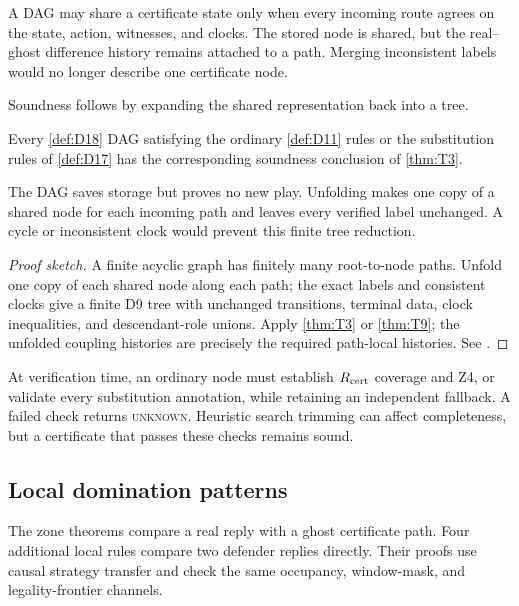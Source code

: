\begin{plainterms}
A DAG may share a certificate state only when every incoming route agrees on
the state, action, witnesses, and clocks.  The stored node is shared, but the
real--ghost difference history remains attached to a path.  Merging
inconsistent labels would no longer describe one certificate node.
\end{plainterms}

Soundness follows by expanding the shared representation back into a tree.

\begin{theorem}
\label{thm:T10}
\upshape
Every \cref{def:D18} DAG satisfying the ordinary \cref{def:D11} rules or the
substitution rules of \cref{def:D17} has the corresponding soundness
conclusion of \cref{thm:T3}.
\end{theorem}

\begin{plainterms}
The DAG saves storage but proves no new play.  Unfolding makes one copy of a
shared node for each incoming path and leaves every verified label unchanged.
A cycle or inconsistent clock would prevent this finite tree reduction.
\end{plainterms}

\begin{proof}[Proof sketch]
A finite acyclic graph has finitely many root-to-node paths.  Unfold one copy
of each shared node along each path; the exact labels and consistent clocks
give a finite D9 tree with unchanged transitions, terminal data, clock
inequalities, and descendant-role unions.  Apply \cref{thm:T3} or
\cref{thm:T9}; the unfolded coupling histories are precisely the required
path-local histories.  See \cite{hexobot-companions}.
\end{proof}

At verification time, an ordinary node must establish $R_{\mathrm{cert}}$ coverage and
Z4, or validate every substitution annotation, while retaining an independent
fallback.  A failed check returns \textsc{unknown}.  Heuristic search trimming
can affect completeness, but a certificate that passes these checks remains
sound.

\subsection{Local domination patterns}
\label{sec:domination}

The zone theorems compare a real reply with a ghost certificate path.  Four
additional local rules compare two defender replies directly.  Their proofs
use causal strategy transfer and check the same occupancy, window-mask, and
legality-frontier channels.

